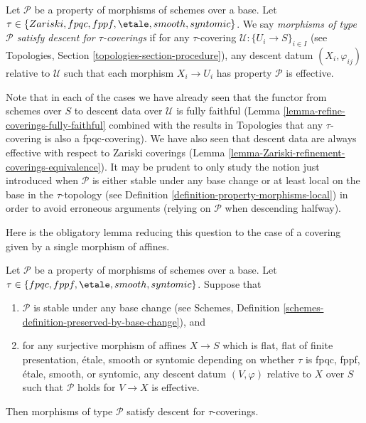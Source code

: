 \begin{definition}
\label{definition-descending-types-morphisms}
Let $\mathcal{P}$ be a property of morphisms of schemes over a base.
Let $\tau \in \{Zariski, fpqc, fppf, \etale, smooth, syntomic\}$.
We say
{\it morphisms of type $\mathcal{P}$ satisfy descent for $\tau$-coverings}
if for
any $\tau$-covering $\mathcal{U} : \{U_i \to S\}_{i \in I}$
(see Topologies, Section \ref{topologies-section-procedure}),
any descent datum $(X_i, \varphi_{ij})$ relative to $\mathcal{U}$
such that each morphism $X_i \to U_i$ has property $\mathcal{P}$
is effective.
\end{definition}

\noindent
Note that in each of the cases we have already seen that
the functor from schemes over $S$ to descent data over
$\mathcal{U}$ is fully faithful
(Lemma \ref{lemma-refine-coverings-fully-faithful} combined
with the results in Topologies that any $\tau$-covering
is also a fpqc-covering).
We have also seen that descent data are always effective with
respect to Zariski coverings
(Lemma \ref{lemma-Zariski-refinement-coverings-equivalence}).
It may be prudent to only study the notion just introduced
when $\mathcal{P}$ is either stable under any base change or at least
local on the base in the $\tau$-topology
(see Definition \ref{definition-property-morphisms-local})
in order to avoid erroneous arguments (relying on $\mathcal{P}$
when descending halfway).

\medskip\noindent
Here is the obligatory lemma reducing this question
to the case of a covering given by a single morphism of affines.

\begin{lemma}
\label{lemma-descending-types-morphisms}
Let $\mathcal{P}$ be a property of morphisms of schemes over a base.
Let $\tau \in \{fpqc, fppf, \etale, smooth, syntomic\}$.
Suppose that
\begin{enumerate}
\item $\mathcal{P}$ is stable under any base change
(see Schemes, Definition \ref{schemes-definition-preserved-by-base-change}),
and
\item for any surjective morphism of affines
$X \to S$ which is flat, flat of finite presentation,
\'etale, smooth or syntomic depending on whether $\tau$ is
fpqc, fppf, \'etale, smooth, or syntomic,
any descent datum $(V, \varphi)$ relative
to $X$ over $S$ such that $\mathcal{P}$ holds for
$V \to X$ is effective.
\end{enumerate}
Then morphisms of type $\mathcal{P}$ satisfy descent for $\tau$-coverings.
\end{lemma}

